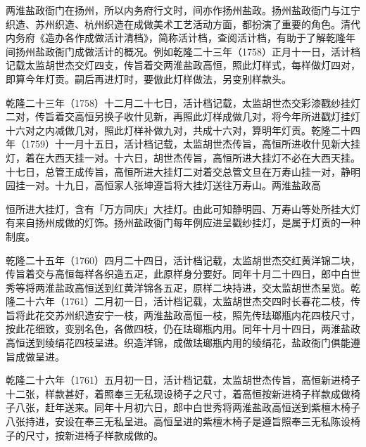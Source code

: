 两淮盐政衙门在扬州，所以内务府行文时，间亦作扬州盐政。扬州盐政衙门与江宁织造、苏州织造、杭州织造在成做美术工艺活动方面，都扮演了重要的角色。清代内务府《造办各作成做活计清档》，简称活计档，查阅活计档，有助于了解乾隆年间扬州盐政衙门成做活计的概况。例如乾隆二十三年（1758）正月十一日，活计档记载太监胡世杰交灯四支，传旨着交两淮盐政高恒，照此灯样式，每样做灯四对，即算今年灯贡。嗣后再进灯时，要倣此灯样做法，另变别样款头。

乾隆二十三年（1758）十二月二十七日，活计档记载，太监胡世杰交彩漆戳纱挂灯二对，传旨着交高恒另换子收什见新，再照此灯样成做几对，将今年所进戳灯挂灯十六对之内减做几对，照此灯样补做九对，共成十六对，算明年灯贡。乾隆二十四年（1759）十一月十五日，活计档记载，太监胡世杰传旨，高恒所进收什见新大挂灯，着在大西天挂一对。十六日，胡世杰传旨，高恒所进大挂灯不必在大西天挂。十七日，总管王成传旨，高恒所进大挂灯二对着交总管文旦在万寿山挂一对，静明园挂一对。十九日，高恒家人张坤遵旨将大挂灯送往万寿山。两淮盐政高

\vfill
\begin{BookNotes}
\end{BookNotes}

\noindent 恒所进大挂灯，含有「万方同庆」大挂灯。由此可知静明园、万寿山等处所挂大灯有来自扬州成做的灯饰。扬州盐政衙门每年例应进呈戳纱挂灯，是属于灯贡的一种制度。

乾隆二十五年（1760）四月二十四日，活计档记载，太监胡世杰交红黄洋锦二块，传旨着交与高恒每样各织造五疋，此原样身分要好。同年十月二十四日，郎中白世秀等将两淮盐政高恒送到红黄洋锦各五疋，原样二块持进，交太监胡世杰呈览。乾隆二十六年（1761）二月初一日，活计档记载，太监胡世杰交四时长春花二枝，传旨将此花交苏州织造安宁一枝，两淮盐政高恒一枝，照先传珐瑯瓶内花四枝尺寸，按此花细致，变别名色，各做四枝，仍在珐瑯瓶内用。同年十月十四日，两淮盐政高恒送到绫绢花四枝呈进。织造洋锦，成做珐瑯瓶内用的绫绢花，盐政衙门俱能遵旨成做呈进。

乾隆二十六年（1761）五月初一日，活计档记载，太监胡世杰传旨，高恒新进椅子十二张，样款甚好，着照奉三无私现设椅子之尺寸，着高恒按新进椅子样款成做椅子八张，赶年送来。同年十月初六日，郎中白世秀将两淮盐政高恒送到紫檀木椅子八张持进，安设在奉三无私呈进。高恒呈进的紫檀木椅子是遵旨照奉三无私陈设椅子的尺寸，按新进椅子样款成做的。

